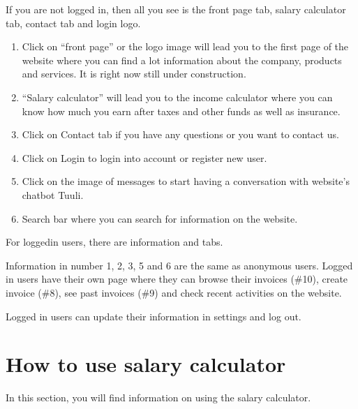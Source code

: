 \documentclass[letterpaper,10pt,english]{sphinxmanual}
\begin{document}
\sphinxAtStartPar
If you are not logged in, then all you see is the front page tab, salary calculator tab, contact tab and login logo.

\noindent{}
\begin{enumerate}
%
\item {} 
\sphinxAtStartPar
Click on “front page” or the logo image  will lead you to the first page of the website where you can find a lot information about the company, products and services. It is right now still under construction.

\item {} 
\sphinxAtStartPar
“Salary calculator” will lead you to the income calculator where you can know how much you earn after taxes and other funds as well as insurance.

\item {} 
\sphinxAtStartPar
Click on Contact tab if you have any questions or you want to contact us.

\item {} 
\sphinxAtStartPar
Click on Login to login into account or register new user.

\item {} 
\sphinxAtStartPar
Click on the image of messages to start having a conversation with website’s chatbot Tuuli.

\item {} 
\sphinxAtStartPar
Search bar where you can search for information on the website.

\end{enumerate}

\sphinxAtStartPar
For logged\sphinxhyphen{}in users, there are information and tabs.

\noindent{}

\sphinxAtStartPar
Information in number 1, 2, 3, 5 and 6 are the same as anonymous users. Logged in users have their own page where they can browse their invoices (\#10), create invoice (\#8), see past invoices (\#9) and check recent activities on the website.

\sphinxAtStartPar
Logged in users can update their information in settings and log out.

\noindent{}

\sphinxstepscope


\chapter{How to use salary calculator}
\label{\detokenize{pages/salary-calculator:how-to-use-salary-calculator}}\label{\detokenize{pages/salary-calculator::doc}}
\sphinxAtStartPar
In this section, you will find information on using the salary calculator.
\end{document}
